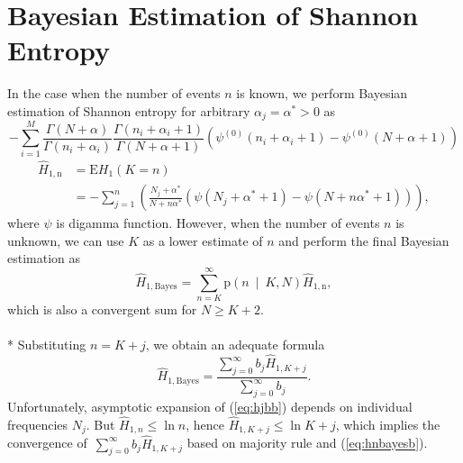 \section {Bayesian Estimation of Shannon Entropy}
In the case when the number of events $n$ is known, we perform Bayesian estimation of Shannon entropy for arbitrary $\alpha_j = \alpha^{*} > 0$ as
\begin{equation} 
 -\sum_{i=1}^M \frac{\Gamma(N+\alpha)}{\Gamma(n_i+\alpha_i)} \frac{\Gamma(n_i+\alpha_i+1)}{\Gamma(N+\alpha+ 1)}\left(\psi^{(0)}(n_i+\alpha_i+1) -\psi^{(0)}(N+\alpha+ 1) \right) 
\end{equation}
\begin{equation} 
\label{eq:hjednan}
\begin{split}
\hat{H}_{1,\mathrm{n}} & = \text{E}H_{1}(K=n) \\ & = -\sum_{j=1}^{n} \left( \frac{N_{j}+\alpha^*}{N+n\alpha^*} \left( \psi(N_{j}+\alpha^*+1) - \psi(N+n\alpha^*+1) \right) \right),
\end{split}
\end{equation}
where $\psi$ is digamma function. However, when the number of events $n$ is unknown, we can use $K$ as a lower estimate of $n$ and perform the final Bayesian estimation as
\begin{equation} 
\label{eq:hjednab}
\hat{H}_{1,\mathrm{Bayes}} = \sum_{n=K}^{\infty}{\text{p}\left(n \: \middle| \:K,N \right)\hat{H}_{1,\mathrm{n}}},
\end{equation}
which is also a convergent sum for $N \ge K+2$. \\
\\*
Substituting $n=K+j$, we obtain an adequate formula
\begin{equation} 
\label{eq:hjbb}
\hat{H}_{1,\mathrm{Bayes}} = \frac{\sum_{j=0}^{\infty}b_{j}\hat{H}_{1,K+j}}{\sum_{j=0}^{\infty}b_{j}}.
\end{equation}
Unfortunately, asymptotic expansion of (\ref{eq:hjbb}) depends on individual frequencies $N_{j}$. But $\hat{H}_{1,n} \leq \ln{n}$, hence $\hat{H}_{1,K+j} \leq \ln{K+j}$, which implies the convergence of~$\sum_{j=0}^{\infty}b_{j}\hat{H}_{1,K+j}$ based on majority rule and (\ref{eq:hnbayesb}).